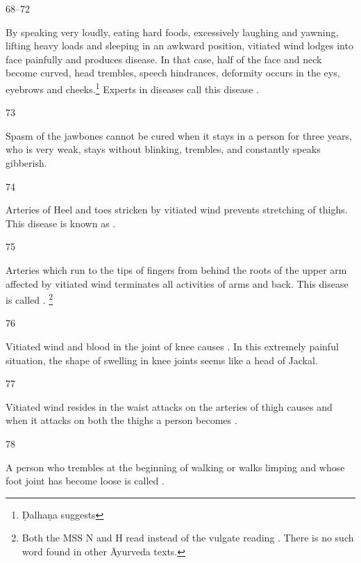 \begin{translation}
\item[68--72]

	By speaking very loudly, eating hard foods, excessively laughing and
	yawning, lifting heavy loads and sleeping in an awkward position,
	vitiated wind lodges into face painfully and produces
	 disease. In that case, half of
	the face and neck become curved, head trembles, speech hindrances,
	deformity occurs in the eys, eyebrows and cheeks.\footnote{Ḍalhaṇa
	suggests } Experts in
	diseases call this disease . 

\item[73]

	Spasm of the jawbones cannot be cured when it stays in a person for
	three years, who is very weak, stays without blinking, trembles, and
	constantly speaks gibberish.

\item[74]

	Arteries of Heel and toes stricken by vitiated wind prevents stretching
	of thighs. This disease is known as .

\item[75]

	Arteries which run to the tips of fingers from behind the roots of the
	upper arm affected by vitiated wind terminates all activities of arms
	and back.  This disease is called . \footnote{Both the MSS N and H read  instead of the
	vulgate reading . There is no such word found in other
	Āyurveda texts.}

\item[76]

	Vitiated wind and blood in the joint of knee causes
	. In this extremely painful
	situation, the shape of swelling in knee joints seems like a head of
	Jackal. 

\item[77]

	Vitiated wind resides in the waist attacks on the arteries of thigh
	causes  and when it attacks on both the thighs a
	person becomes .

\item[78]

	A person who trembles at the beginning of walking or walks limping and
	whose foot joint has become loose is called
	.


\end{translation}
